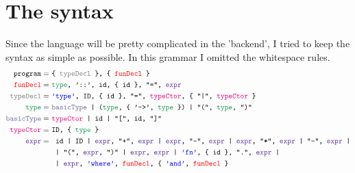 \documentclass{article}
\begin{document}
\section{The syntax}
Since the language will be pretty complicated in the 'backend', I tried to keep the syntax as simple as possible. In this grammar I omitted the whitespace rules.
\begin{align*}
\texttt{program}  =\ & \texttt{\{ \color{gray}typeDecl \color{black} \}, \{ \color{red}funDecl \color{black} \}}\\
\texttt{\color{red}funDecl\color{black}} =\ & \texttt{\color{ForestGreen}type\color{black}, '::', id, \{ id \}, "=", \color{RoyalPurple}expr\color{black}}\\
\texttt{\color{gray}typeDecl\color{black}} =\ &\texttt{\color{blue}'type'\color{black}, ID, \{ id \}, "=", \color{RubineRed}typeCtor\color{black}, \{ "|", \color{RubineRed}typeCtor \color{black} \}}\\
\texttt{\color{ForestGreen}type\color{black}} =\ &\texttt{\color{CadetBlue}basicType \color{black} | (\color{ForestGreen}type\color{black}, \{ '->', \color{ForestGreen}type \color{black} \}) | "(", \color{ForestGreen}type\color{black}, ")"}\\
\texttt{\color{CadetBlue}basicType} =\ &	\texttt{\color{RubineRed}typeCtor \color{black}| id | "[", id, "]"}\\
\texttt{\color{RubineRed}typeCtor\color{black}} =\ & \texttt{ID, \{ \color{ForestGreen}type \color{black} \}}\\
\texttt{\color{RoyalPurple}expr\color{black}} =\ &  \texttt{
	id
	| ID
	| \color{RoyalPurple}expr\color{black}, "+", \color{RoyalPurple}expr \color{black} 
	| \color{RoyalPurple}expr\color{black}, "-", \color{RoyalPurple}expr \color{black} 
	| \color{RoyalPurple}expr\color{black}, "*", \color{RoyalPurple}expr \color{black}
	| "-", \color{RoyalPurple}expr \color{black}
|}\\
&\texttt{
	| "(", \color{RoyalPurple}expr\color{black}, ")" 
	| \color{RoyalPurple}expr\color{black}, \color{RoyalPurple}expr \color{black} 
	| \color{blue}'fn'\color{black}, \{ id \}, ".", \color{RoyalPurple}expr \color{black} 
|}\\
&\texttt{
	| \color{RoyalPurple}expr\color{black}, \color{blue}'where'\color{black}, \color{red} funDecl\color{black}, \{ \color{blue}'and'\color{black}, \color{red}funDecl \color{black} \} 
}
\end{align*}
\end{document}
